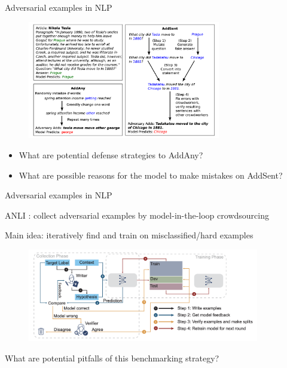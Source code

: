 \documentclass[usenames,dvipsnames,notes,11pt,aspectratio=169,hyperref={colorlinks=true, linkcolor=blue}]{beamer}
\begin{document}
\begin{frame}
    {Adversarial examples in NLP}

    \begin{figure}
    \includegraphics[width=0.75\textwidth]{figures/advqa-approach}
    \end{figure}
    \vspace{-1em}
    \begin{itemize}
        \item What are potential defense strategies to AddAny?\pause
        \item What are possible reasons for the model to make mistakes on AddSent?
    \end{itemize}
\end{frame}

\begin{frame}
    {Adversarial examples in NLP}

    ANLI : collect adversarial examples by model-in-the-loop crowdsourcing

    Main idea: iteratively find and train on misclassified/hard examples\vspace{-1em}
    \begin{figure}
        \includegraphics[width=0.9\textwidth]{figures/anli}
    \end{figure}

    {What are potential pitfalls of this benchmarking strategy?}
\end{frame}
\end{document}

